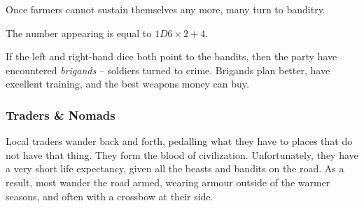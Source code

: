 \begin{multicols}{2}
Once farmers cannot sustain themselves any more, many turn to banditry.

The number appearing is equal to $1D6\times 2 + 4$.

If the left and right-hand dice both point to the bandits, then the party have encountered \emph{brigands} -- soldiers turned to crime.
Brigands plan better, have excellent training, and the best weapons money can buy.


\subsubsection{Traders \& Nomads}

Local traders wander back and forth, pedalling what they have to places that do not have that thing.
They form the blood of civilization.
Unfortunately, they have a very short life expectancy, given all the beasts and bandits on the road.
As a result, most wander the road armed, wearing armour outside of the warmer seasons, and often with a crossbow at their side.

























\end{multicols}
